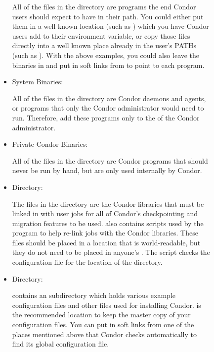 \begin{description}
\begin{description}
\begin{itemize}
     All of the files in the  directory are programs the end
     Condor users should expect to have in their path.  You could
     either put them in a well known location (such as
     ) which you have Condor users add to
     their  environment variable, or copy those files
     directly into a well known place already in the user's PATHs (such as
     ).  With the above examples, you could also
     leave the binaries in  and put in
     soft links from  to point to each program.

     \item System Binaries:

     All of the files in the  directory are Condor daemons and
     agents, or programs that only the Condor administrator would need
     to run.  Therefore, add these programs only
     to the  of the Condor administrator.

     \item Private Condor Binaries:

     All of the files in the  directory are Condor
     programs that should never be run by hand, but are only used
     internally by Condor. 

     \item {} Directory:

     The files in the  directory are the Condor libraries that
     must be linked in with user jobs for all of Condor's
     checkpointing and migration features to be used.   also
     contains scripts used by the  program to help
     re-link jobs with the Condor libraries.  These files should be
     placed in a location that is world-readable, but they do not need
     to be placed in anyone's .  The  script checks
     the configuration file for the location of the  directory.

     \item {} Directory:

      contains an  subdirectory which holds various
     example configuration files and other files used for installing Condor.
      is the recommended location to keep the master copy of your
     configuration files.  You can put in soft links from one of the places
     mentioned above that Condor checks automatically to find its
     global configuration file. 
\end{itemize}


\end{description}
\end{description}
